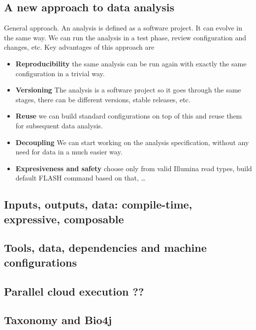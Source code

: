 \documentclass{frontiersSCNS} %
\providecommand{\tightlist}{%
\setlength{\itemsep}{0pt}\setlength{\parskip}{0pt}}
\begin{document}
\subsection{A new approach to data
analysis}\label{a-new-approach-to-data-analysis}

General approach. An analysis is defined as a software project. It can
evolve in the same way. We can run the analysis in a test phase, review
configuration and changes, etc. Key advantages of this approach are

\begin{itemize}
\tightlist
\item
  \textbf{Reproducibility} the same analysis can be run again with
  exactly the same configuration in a trivial way.
\item
  \textbf{Versioning} The analysis is a software project so it goes
  through the same stages, there can be different versions, stable
  releases, etc.
\item
  \textbf{Reuse} we can build standard configurations on top of this and
  reuse them for subsequent data analysis.
\item
  \textbf{Decoupling} We can start working on the analysis
  specification, without any need for data in a much easier way.
\item
  \textbf{Expresiveness and safety} choose only from valid Illumina read
  types, build default FLASH command based on that, \ldots{}
\end{itemize}

\subsection{Inputs, outputs, data: compile-time, expressive,
composable}\label{inputs-outputs-data-compile-time-expressive-composable}

\subsection{Tools, data, dependencies and machine
configurations}\label{tools-data-dependencies-and-machine-configurations}

\subsection{Parallel cloud execution ??}\label{parallel-cloud-execution}

\subsection{Taxonomy and Bio4j}\label{taxonomy-and-bio4j}
\end{document}
